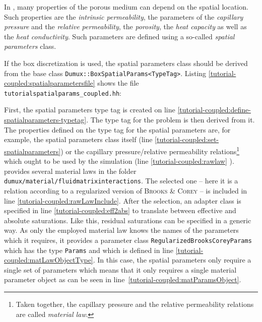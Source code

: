 In \Dumux, many properties of the porous medium can depend on the
spatial location. Such properties are the \textit{intrinsic
  permeability}, the parameters of the \textit{capillary pressure} and
the \textit{relative permeability}, the \textit{porosity}, the
\textit{heat capacity} as well as the \textit{heat conductivity}. Such
parameters are defined using a so-called \textit{spatial parameters}
class.

If the box discretization is used, the spatial parameters class
should be derived from the base class
\texttt{Dumux::BoxSpatialParams<TypeTag>}. Listing
\ref{tutorial-coupled:spatialparametersfile} shows the file \\
\verb+tutorialspatialparams_coupled.hh+:

\begin{lst}\label{tutorial-coupled:spatialparametersfile} \mbox{}

\end{lst}

First, the spatial parameters type tag is created on line
\ref{tutorial-coupled:define-spatialparameters-typetag}. The type tag
for the problem is then derived from it. The \Dumux properties defined on
the type tag for the spatial parameters are, for example, the spatial
parameters class itself (line
\ref{tutorial-coupled:set-spatialparameters}) or the capillary
pressure/relative permeability relations\footnote{Taken together, the
  capillary pressure and the relative permeability relations are
  called \textit{material law}.} which ought to be used by the
simulation (line
\ref{tutorial-coupled:rawlaw} \label{tutorial-coupled:materialLaw}).
\Dumux provides several material laws in the folder
\verb+dumux/material/fluidmatrixinteractions+.  The selected one --
here it is a relation according to a regularized version of
\textsc{Brooks} \& \textsc{Corey} -- is included in line
\ref{tutorial-coupled:rawLawInclude}. 
After the selection, an adapter class is specified in line \ref{tutorial-coupled:eff2abs} to
translate between effective and absolute saturations. Like this,
residual saturations can be specified in a generic way.  As only the employed
material law knows the names of the parameters which it
requires, it provides a parameter class
\texttt{RegularizedBrooksCoreyParams} which has the type
\texttt{Params} and which is defined in line
\ref{tutorial-coupled:matLawObjectType}. In this case, the spatial
parameters only require a single set of parameters which means that it
only requires a single material parameter object as can be seen in
line~\ref{tutorial-coupled:matParamsObject}.

